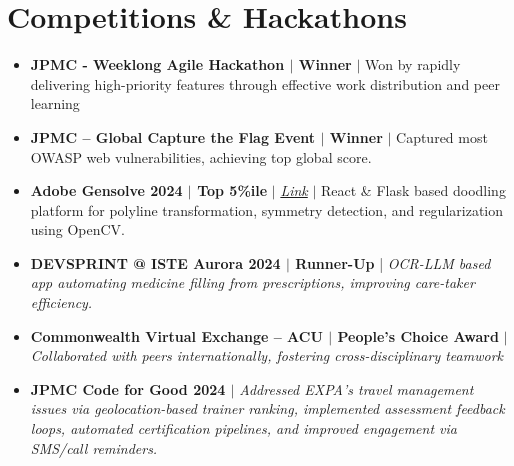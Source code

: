 \documentclass[10pt]{article}
\newcommand{\resumeCertHeading}[1]{
    \item \small #1 \vspace{-4.5pt}
}
\newcommand{\resumeSubHeadingListStart}{\vspace{-1pt}\begin{itemize}[leftmargin=0.10 in, label={}]}
\newcommand{\resumeSubHeadingListEnd}{\end{itemize}}
\begin{document}
\section{Competitions \& Hackathons}
\resumeSubHeadingListStart
\resumeCertHeading
{\textbf{JPMC - Weeklong Agile Hackathon $|$ Winner } $|$ Won by rapidly delivering high-priority features through effective work distribution and peer learning}
\resumeCertHeading
{\textbf{JPMC – Global Capture the Flag Event $|$ Winner } $|$ Captured most OWASP web vulnerabilities, achieving top global score.}
\resumeCertHeading
{\textbf{Adobe Gensolve 2024 $|$ Top 5\%ile } $|$ \footnotesize\emph{\href{https://drive.google.com/file/d/1pWoLmEphNQBDTTapcTiruJGMoiKKBAM_/view?usp=sharing}{Link}} $|$ React \& Flask based doodling platform for polyline transformation, symmetry detection, and regularization using OpenCV. }

\resumeCertHeading
{\textbf{DEVSPRINT @ ISTE Aurora 2024 $|$ Runner-Up } | \emph{OCR-LLM based app automating medicine filling from prescriptions, improving care-taker efficiency. }}

\resumeCertHeading
{\textbf{Commonwealth Virtual Exchange – ACU $|$ People's Choice Award} $|$ \emph{Collaborated with peers internationally, fostering cross-disciplinary teamwork}}

\resumeCertHeading
{\textbf{JPMC Code for Good 2024 $|$} \emph{Addressed EXPA’s travel management issues via geolocation-based trainer ranking, implemented assessment feedback loops, automated certification pipelines, and improved engagement via SMS/call reminders.}}
\resumeSubHeadingListEnd
\end{document}
